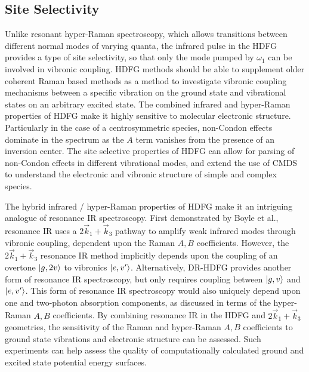 \documentclass[aip, jcp, reprint, onecolumn]{revtex4-2}
\begin{document}
\subsection{Site Selectivity}
Unlike resonant hyper-Raman spectroscopy, which allows transitions between different normal modes of varying quanta, the infrared pulse in the HDFG provides a type of site selectivity,\cite{RN103, Carlson1991} so that only the mode pumped by $\omega_1$ can be involved in vibronic coupling.  
HDFG methods should be able to supplement older coherent Raman based methods as a method to investigate vibronic coupling mechanisms between a specific vibration on the ground state and vibrational states on an arbitrary excited state.\cite{RN103}
The combined infrared and hyper-Raman properties of HDFG make it highly sensitive to molecular electronic structure.
Particularly in the case of a centrosymmetric species, non-Condon effects dominate in the spectrum as the $A$ term vanishes from the presence of an inversion center.
The site selective properties of HDFG can allow for parsing of non-Condon effects in different vibrational modes, and extend the use of CMDS to understand the electronic and vibronic structure of simple and complex species.

The hybrid infrared / hyper-Raman properties of HDFG make it an intriguing analogue of resonance IR spectroscopy.
First demonstrated by Boyle et al., resonance IR uses a $2\vec{k}_1 + \vec{k}_3$ pathway to amplify weak infrared modes through vibronic coupling, dependent upon the Raman $A,B$ coefficients. \cite{RN491}
However, the $2\vec{k}_1 + \vec{k}_3$ resonance IR method implicitly depends upon the coupling of an overtone $\ket{g,2v}$ to vibronics $\ket{e,v'}$.
Alternatively, DR-HDFG provides another form of resonance IR spectroscopy, but only requires coupling between $\ket{g,v}$ and $\ket{e,v'}$.
This form of resonance IR spectroscopy would also uniquely depend upon one and two-photon absorption components, as discussed in terms of the hyper-Raman $A,B$ coefficients.
By combining resonance IR in the HDFG and $2\vec{k}_1 + \vec{k}_3$ geometries, the sensitivity of the Raman and hyper-Raman $A,B$ coefficients to ground state vibrations and electronic structure can be assessed. 
Such experiments can help assess the quality of computationally calculated ground and excited state potential energy surfaces. 
\end{document}
